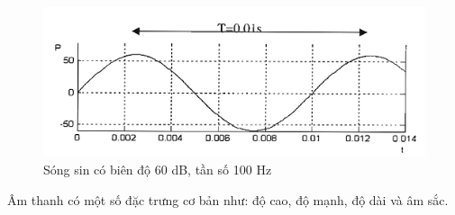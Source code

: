 \begin{figure}[h]
    \centering
    \includegraphics[scale=1]{sinwave}
    \caption{Sóng sin có biên độ 60 dB, tần số 100 Hz}
    \label{fig:c2_sinwave}
\end{figure}

Âm thanh có một số đặc trưng cơ bản như: độ cao, độ mạnh, độ dài và âm sắc.
